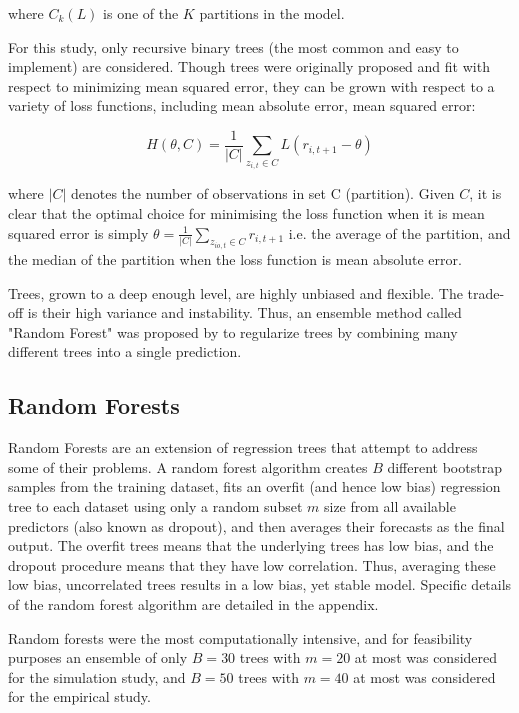 \documentclass[a4paper, table]{article}
\begin{document}
where $C_k(L)$ is one of the $K$ partitions in the model.

For this study, only recursive binary trees (the most common and easy to implement) are considered. Though trees were originally proposed and fit with respect to minimizing mean squared error, they can be grown with respect to a variety of loss functions, including mean absolute error, mean squared error:

\begin{equation}
	H(\theta, C) = \frac{1}{|C|} \sum_{z_{i,t} \in C} L(r_{i,t+1} - \theta)
\end{equation}

where $|C|$ denotes the number of observations in set C (partition). Given $C$, it is clear that the optimal choice for minimising the loss function when it is mean squared error is simply $\theta = \frac{1}{|C|} \sum_{z_{io,t}\in C}^{ }r_{i,t+1}$ i.e. the average of the partition, and the median of the partition when the loss function is mean absolute error.

Trees, grown to a deep enough level, are highly unbiased and flexible. The trade-off is their high variance and instability. Thus, an ensemble method called "Random Forest" was proposed by \cite{breiman_random_2001} to regularize trees by combining many different trees into a single prediction.

\subsection{Random Forests}
Random Forests are an extension of regression trees that attempt to address some of their problems. A random forest algorithm creates $B$ different bootstrap samples from the training dataset, fits an overfit (and hence low bias) regression tree to each dataset using only a random subset $m$ size from all available predictors (also known as dropout), and then averages their forecasts as the final output. The overfit trees means that the underlying trees has low bias, and the dropout procedure means that they have low correlation. Thus, averaging these low bias, uncorrelated trees results in a low bias, yet stable model. Specific details of the random forest algorithm are detailed in the appendix.

Random forests were the most computationally intensive, and for feasibility purposes an ensemble of only $B = 30$ trees with $m = 20$ at most was considered for the simulation study, and $B = 50$ trees with $m = 40$ at most was considered for the empirical study.
\end{document}
